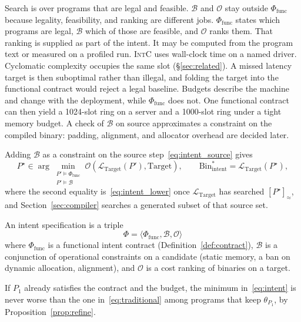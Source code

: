 Search is over programs that are legal and feasible.
\(\mathcal{B}\) and \(\mathcal{O}\) stay outside \(\Phi_{\text{func}}\)
because legality, feasibility, and ranking are different jobs.
\(\Phi_{\text{func}}\) states which programs are legal, \(\mathcal{B}\)
which of those are feasible, and \(\mathcal{O}\) ranks them. That ranking
is supplied as part of the intent. It may be computed from the program
text or measured on a profiled run. \textsc{IntC} uses wall-clock time on
a named driver. Cyclomatic complexity occupies the same slot
(\S\ref{sec:related}). A missed latency target is then suboptimal rather
than illegal, and folding the target into the functional contract would
reject a legal baseline. Budgets describe the machine and change with the
deployment, while \(\Phi_{\text{func}}\) does not.
One functional contract can then yield a 1024-slot ring on a server and a
1000-slot ring under a tight memory budget. A check of \(\mathcal{B}\) on source
approximates a constraint on the compiled binary: padding, alignment, and
allocator overhead are decided later.

Adding \(\mathcal{B}\) as a constraint on the source
step~\eqref{eq:intent_source} gives
\begin{equation}
\label{eq:intent}
P^\star \in \arg\min_{\substack{P' \models \Phi_{\text{func}} \\ P' \models \mathcal{B}}}
\mathcal{O}(\mathcal{L}_{\text{Target}}(P'), \text{Target}),
\qquad
\mathrm{Bin}^*_{\text{intent}} = \mathcal{L}_{\text{Target}}(P^\star),
\end{equation}
where the second equality is~\eqref{eq:intent_lower} once
\(\mathcal{L}_{\text{Target}}\) has searched \([P^\star]_\approx\), and
Section~\ref{sec:compiler} searches a generated subset of that source set.

\begin{definition}
\label{def:intent_spec}
An intent specification is a triple
\[
\Phi = \langle \Phi_{\text{func}}, \mathcal{B}, \mathcal{O} \rangle
\]
where \(\Phi_{\text{func}}\) is a functional intent contract
(Definition~\ref{def:contract}), \(\mathcal{B}\) is a conjunction of
operational constraints on a candidate (static memory, a ban on dynamic
allocation, alignment), and \(\mathcal{O}\) is a cost ranking of binaries on
a target.
\end{definition}

If \(P_1\) already satisfies the contract and the budget, the minimum
in~\eqref{eq:intent} is never worse than the one in~\eqref{eq:traditional}
among programs that keep \(\theta_{P_1}\), by Proposition~\ref{prop:refine}.
